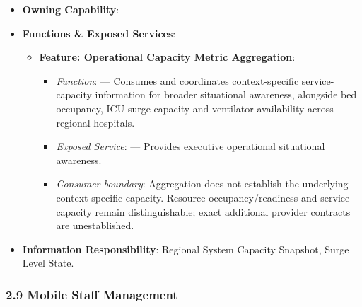 \begin{itemize}

\item
\textbf{Owning Capability}: \texttt{}



\item
\textbf{Functions \& Exposed Services}:


\begin{itemize}

\item
\textbf{Feature: Operational Capacity Metric Aggregation}:


\begin{itemize}

\item
\emph{Function}: \texttt{} — Consumes and coordinates context-specific service-capacity information for broader situational awareness, alongside bed occupancy, ICU surge capacity and ventilator availability across regional hospitals.



\item
\emph{Exposed Service}: \texttt{} — Provides executive operational situational awareness.



\item
\emph{Consumer boundary}: Aggregation does not establish the underlying context-specific capacity. Resource occupancy/\allowbreak{}readiness and service capacity remain distinguishable; exact additional provider contracts are unestablished.



\end{itemize}


\end{itemize}


\item
\textbf{Information Responsibility}: Regional System Capacity Snapshot, Surge Level State.



\end{itemize}
\label{rad:hso:187}

\par\smallskip
{}\label{rad:hso:189}
\subsubsection*{2.9 Mobile Staff Management}
\label{rad:hso:190}

